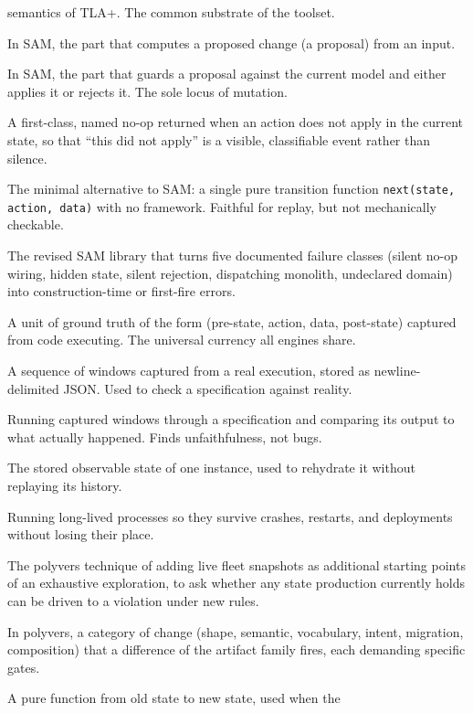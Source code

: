 \documentclass[11pt]{article}
\newcommand{\tool}[1]{\textsf{#1}}
\newcommand{\code}[1]{\texttt{#1}}
\begin{document}
\begin{description}[leftmargin=0pt, style=nextline]
  semantics of TLA+. The common substrate of the toolset.
\item[Action] In SAM, the part that computes a proposed change (a proposal)
  from an input.
\item[Acceptor] In SAM, the part that guards a proposal against the current
  model and either applies it or rejects it. The sole locus of mutation.
\item[Reject (observable rejection)] A first-class, named no-op returned when an
  action does not apply in the current state, so that ``this did not apply'' is
  a visible, classifiable event rather than silence.
\item[Bare-next contract] The minimal alternative to SAM: a single pure
  transition function \code{next(state, action, data)} with no framework. Faithful
  for replay, but not mechanically checkable.
\item[SAM v2 strict profile] The revised SAM library that turns five documented
  failure classes (silent no-op wiring, hidden state, silent rejection,
  dispatching monolith, undeclared domain) into construction-time or first-fire
  errors.
\item[Window] A unit of ground truth of the form (pre-state, action, data,
  post-state) captured from code executing. The universal currency all engines
  share.
\item[Trace] A sequence of windows captured from a real execution, stored as
  newline-delimited JSON. Used to check a specification against reality.
\item[Replay] Running captured windows through a specification and comparing its
  output to what actually happened. Finds unfaithfulness, not bugs.
\item[Snapshot] The stored observable state of one instance, used to rehydrate
  it without replaying its history.
\item[Durable execution] Running long-lived processes so they survive crashes,
  restarts, and deployments without losing their place.
\item[Seeded model check] The \tool{polyvers} technique of adding live fleet
  snapshots as additional starting points of an exhaustive exploration, to ask
  whether any state production currently holds can be driven to a violation
  under new rules.
\item[Lane] In \tool{polyvers}, a category of change (shape, semantic,
  vocabulary, intent, migration, composition) that a difference of the artifact
  family fires, each demanding specific gates.
\item[Migration] A pure function from old state to new state, used when the

\end{description}
\end{document}
